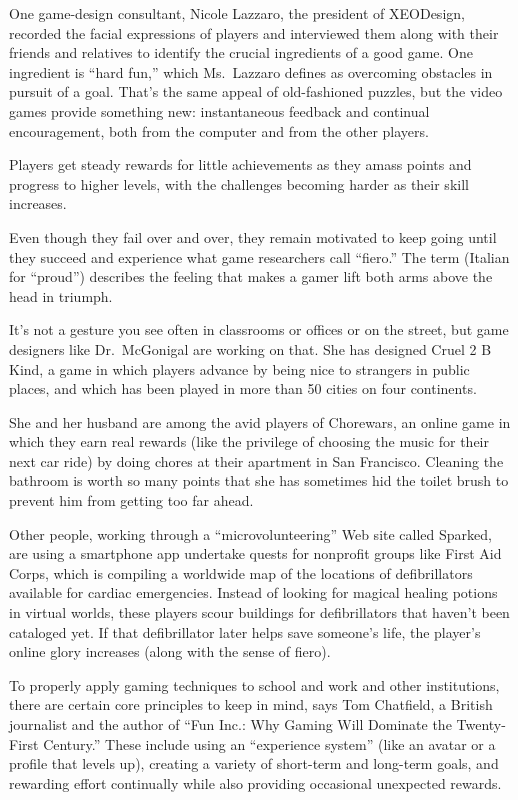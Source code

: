 ﻿\documentclass[12pt]{article}
\begin{document}
One game-design consultant, Nicole Lazzaro, the president of XEODesign, recorded the facial
expressions of players and interviewed them along with their friends and relatives to identify the
crucial ingredients of a good game. One ingredient is ``hard fun,'' which Ms.~Lazzaro defines as
overcoming obstacles in pursuit of a goal. That's the same appeal of old-fashioned puzzles, but the
video games provide something new: instantaneous feedback and continual encouragement, both from the
computer and from the other players.

Players get steady rewards for little achievements as they amass points and progress to higher
levels, with the challenges becoming harder as their skill increases.

Even though they fail over and over, they remain motivated to keep going until they succeed and
experience what game researchers call ``fiero.'' The term (Italian for ``proud'') describes the
feeling that makes a gamer lift both arms above the head in triumph.

It's not a gesture you see often in classrooms or offices or on the street, but game designers like
Dr.~McGonigal are working on that. She has designed Cruel 2 B Kind, a game in which players advance
by being nice to strangers in public places, and which has been played in more than 50 cities on
four continents.

She and her husband are among the avid players of Chorewars, an online game in which they earn real
rewards (like the privilege of choosing the music for their next car ride) by doing chores at their
apartment in San Francisco. Cleaning the bathroom is worth so many points that she has sometimes hid
the toilet brush to prevent him from getting too far ahead.

Other people, working through a ``microvolunteering'' Web site called Sparked, are using a
smartphone app undertake quests for nonprofit groups like First Aid Corps, which is compiling a
worldwide map of the locations of defibrillators available for cardiac emergencies. Instead of
looking for magical healing potions in virtual worlds, these players scour buildings for
defibrillators that haven't been cataloged yet. If that defibrillator later helps save someone's
life, the player's online glory increases (along with the sense of fiero).

To properly apply gaming techniques to school and work and other institutions, there are certain
core principles to keep in mind, says Tom Chatfield, a British journalist and the author of ``Fun
Inc.: Why Gaming Will Dominate the Twenty-First Century.'' These include using an ``experience
system'' (like an avatar or a profile that levels up), creating a variety of short-term and
long-term goals, and rewarding effort continually while also providing occasional unexpected
rewards.
\end{document}
